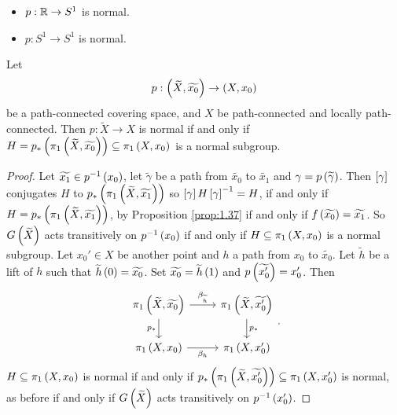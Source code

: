 \begin{example*}
\hfill
\begin{itemize}
\item $ p : \R \to S^1 $ is normal.
\item $ p : S^1 \to S^1 $ is normal.
\end{itemize}
\end{example*}

\begin{proposition}
Let
$$ p : \rb{\widetilde{X}, \widetilde{x_0}} \to \rb{X, x_0} $$
be a path-connected covering space, and $ X $ be path-connected and locally path-connected. Then $ p : \widetilde{X} \to X $ is normal if and only if $ H = p_*\rb{\pi_1\rb{\widetilde{X}, \widetilde{x_0}}} \subseteq \pi_1\rb{X, x_0} $ is a normal subgroup.
\end{proposition}

\begin{proof}
Let $ \widetilde{x_1} \in p^{-1}\rb{x_0} $, let $ \widetilde{\gamma} $ be a path from $ \widetilde{x_0} $ to $ \widetilde{x_1} $ and $ \gamma = p\rb{\widetilde{\gamma}} $. Then $ \sb{\gamma} $ conjugates $ H $ to $ p_*\rb{\pi_1\rb{\widetilde{X}, \widetilde{x_1}}} $ so $ \sb{\gamma}H\sb{\gamma}^{-1} = H $, if and only if $ H = p_*\rb{\pi_1\rb{\widetilde{X}, \widetilde{x_1}}} $, by Proposition \ref{prop:1.37} if and only if $ f\rb{\widetilde{x_0}} = \widetilde{x_1} $. So $ G\rb{\widetilde{X}} $ acts transitively on $ p^{-1}\rb{x_0} $ if and only if $ H \subseteq \pi_1\rb{X, x_0} $ is a normal subgroup. Let $ x_0' \in X $ be another point and $ h $ a path from $ x_0 $ to $ \widetilde{x_0} $. Let $ \widetilde{h} $ be a lift of $ h $ such that $ \widetilde{h}\rb{0} = \widetilde{x_0} $. Set $ \widetilde{x_0} = \widetilde{h}\rb{1} $ and $ p\rb{\widetilde{x_0'}} = x_0' $. Then
$$
\begin{tikzcd}
\pi_1\rb{\widetilde{X}, \widetilde{x_0}} \arrow{r}{\beta_{\widetilde{h}}} \arrow[swap]{d}{p_*} & \pi_1\rb{\widetilde{X}, \widetilde{x_0'}} \arrow{d}{p_*} \\
\pi_1\rb{X, x_0} \arrow[swap]{r}{\beta_h} & \pi_1\rb{X, x_0'}
\end{tikzcd}.
$$
$ H \subseteq \pi_1\rb{X, x_0} $ is normal if and only if $ p_*\rb{\pi_1\rb{\widetilde{X}, \widetilde{x_0'}}} \subseteq \pi_1\rb{X, x_0'} $ is normal, as before if and only if $ G\rb{\widetilde{X}} $ acts transitively on $ p^{-1}\rb{x_0'} $.
\end{proof}



